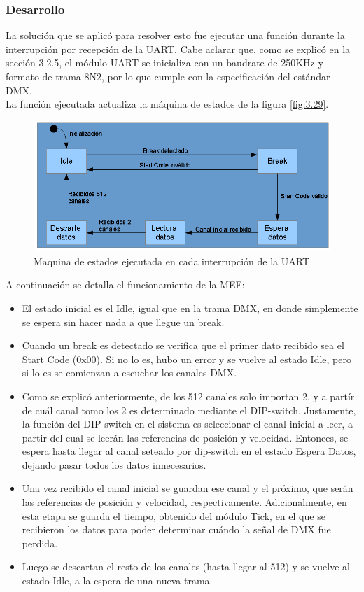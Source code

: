 \subsubsection{Desarrollo}
La solución que se aplicó para resolver esto fue ejecutar una función durante la interrupción por recepción de la UART. Cabe aclarar que, como se explicó en la sección 3.2.5, el  módulo UART se inicializa con un baudrate de 250KHz y formato de trama 8N2, por lo que cumple con la especificación del estándar DMX. \\
La función ejecutada actualiza la máquina de estados de la figura \ref{fig:3.29}.

\begin{figure}[!ht]
	\centering
	\includegraphics[width=16cm,scale=1]{resources/3_29-moduloDMXmef.png}
	\caption{Maquina de estados ejecutada en cada interrupción de la UART}
	\label{fig:\thefigure}
\end{figure}

A continuación se detalla el funcionamiento de la MEF:
\begin{itemize}
	\item El estado inicial es el Idle, igual que en la trama DMX, en donde simplemente se espera sin hacer nada a que llegue un break.
	\item Cuando un break es detectado se verifica que el primer dato recibido sea el Start Code (0x00). Si no lo es, hubo un error y se vuelve al estado Idle, pero si lo es se comienzan a escuchar los canales DMX.
	\item Como se explicó anteriormente, de los 512 canales solo importan 2, y a partír de cuál canal tomo los 2 es determinado mediante el DIP-switch. Justamente, la función del DIP-switch en el sistema es seleccionar el canal inicial a leer, a partir del cual se leerán las referencias de posición y velocidad. Entonces, se espera hasta llegar al canal seteado por dip-switch en el estado Espera Datos, dejando pasar todos los datos innecesarios.
	\item Una vez recibido el canal inicial se guardan ese canal y el próximo, que serán las referencias de posición y velocidad, respectivamente. Adicionalmente, en esta etapa se guarda el tiempo, obtenido del módulo Tick, en el que se recibieron los datos para poder determinar cuándo la señal de DMX fue perdida.
	\item Luego se descartan el resto de los canales (hasta llegar al 512) y se vuelve al estado Idle, a la espera de una nueva trama.
\end{itemize}

